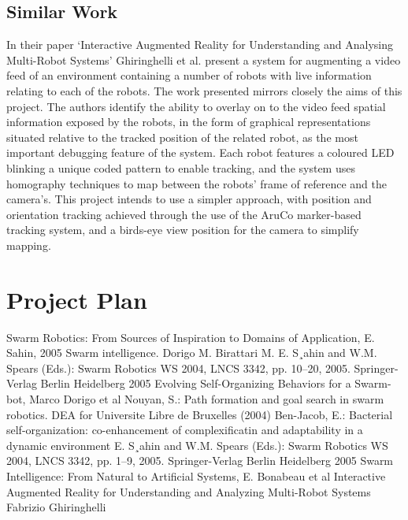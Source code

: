 \documentclass[titlepage,hidelinks,10pt]{article}
\begin{document}
\begin{multicols*}{2}
\subsection{Similar Work} \label{SimilarWork}
In their paper `Interactive Augmented Reality for Understanding and Analysing Multi-Robot Systems' Ghiringhelli et al. present a system for augmenting a video feed of an environment containing a number of robots with live information relating to each of the robots\cite{LEDSwarmAR}. The work presented mirrors closely the aims of this project. The authors identify the ability to overlay on to the video feed spatial information exposed by the robots, in the form of graphical representations situated relative to the tracked position of the related robot, as the most important debugging feature of the system. Each robot features a coloured LED blinking a unique coded pattern to enable tracking, and the system uses homography techniques to map between the robots' frame of reference and the camera's. This project intends to use a simpler approach, with position and orientation tracking achieved through the use of the AruCo marker-based tracking system, and a birds-eye view position for the camera to simplify mapping.

\section{Project Plan}
\begin{thebibliography}{1}
 Swarm Robotics: From Sources of
Inspiration to Domains of Application, E. Sahin, 2005
 Swarm intelligence. Dorigo M. Birattari M.
 E. S¸ahin and W.M. Spears (Eds.): Swarm Robotics WS 2004, LNCS 3342, pp. 10–20, 2005. Springer-Verlag Berlin Heidelberg 2005
 Evolving Self-Organizing Behaviors for a Swarm-bot, Marco Dorigo et al
 Nouyan, S.: Path formation and goal search in swarm robotics. DEA for Universite Libre de Bruxelles (2004)
 Ben-Jacob, E.: Bacterial self-organization: co-enhancement of complexificatin and
adaptability in a dynamic environment
 E. S¸ahin and W.M. Spears (Eds.): Swarm Robotics WS 2004, LNCS 3342, pp. 1–9, 2005. Springer-Verlag Berlin Heidelberg 2005
 Swarm Intelligence: From Natural to Artificial Systems, E. Bonabeau et al
 Interactive Augmented Reality for Understanding and Analyzing Multi-Robot Systems Fabrizio Ghiringhelli
\end{thebibliography}

\end{multicols*}
\end{document}
